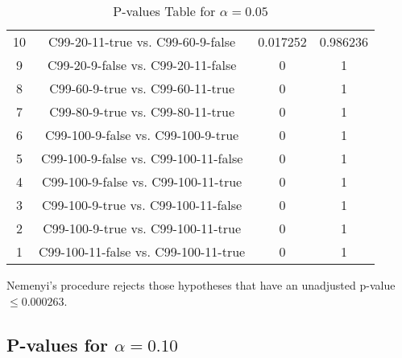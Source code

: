\documentclass[a4paper,10pt]{article}
\begin{document}
\begin{landscape}
\begin{table}[!htp]
\begin{tabular}{cccc}
10&C99-20-11-true vs. C99-60-9-false&0.017252&0.986236\\
9&C99-20-9-false vs. C99-20-11-false&0&1\\
8&C99-60-9-true vs. C99-60-11-true&0&1\\
7&C99-80-9-true vs. C99-80-11-true&0&1\\
6&C99-100-9-false vs. C99-100-9-true&0&1\\
5&C99-100-9-false vs. C99-100-11-false&0&1\\
4&C99-100-9-false vs. C99-100-11-true&0&1\\
3&C99-100-9-true vs. C99-100-11-false&0&1\\
2&C99-100-9-true vs. C99-100-11-true&0&1\\
1&C99-100-11-false vs. C99-100-11-true&0&1\\
\hline
\end{tabular}
\caption{P-values Table for $\alpha=0.05$}
\end{table}Nemenyi's procedure rejects those hypotheses that have an unadjusted p-value $\le0.000263$.

\pagebreak

\subsection{P-values for $\alpha=0.10$}


\end{landscape}
\end{document}
